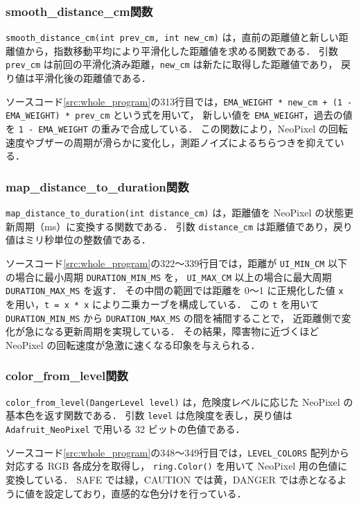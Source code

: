 \documentclass[a4paper,fontsize=11pt,line_length=40zw,number_of_lines=35,baselineskip=1.7zw]{jlreq}
\begin{document}
\subsubsection{smooth\_distance\_cm関数}

\lstinline|smooth_distance_cm(int prev_cm, int new_cm)| は，直前の距離値と新しい距離値から，指数移動平均により平滑化した距離値を求める関数である．
引数 \lstinline|prev_cm| は前回の平滑化済み距離，\lstinline|new_cm| は新たに取得した距離値であり，
戻り値は平滑化後の距離値である．

ソースコード\ref{src:whole_program}の313行目では，\lstinline|EMA_WEIGHT * new_cm + (1 - EMA_WEIGHT) * prev_cm| という式を用いて，
新しい値を \lstinline|EMA_WEIGHT|，過去の値を \lstinline|1 - EMA_WEIGHT| の重みで合成している．
この関数により，NeoPixel の回転速度やブザーの周期が滑らかに変化し，測距ノイズによるちらつきを抑えている．

\subsubsection{map\_distance\_to\_duration関数}

\lstinline|map_distance_to_duration(int distance_cm)| は，距離値を NeoPixel の状態更新周期（ms）に変換する関数である．
引数 \lstinline|distance_cm| は距離値であり，戻り値はミリ秒単位の整数値である．

ソースコード\ref{src:whole_program}の322〜339行目では，距離が \lstinline|UI_MIN_CM| 以下の場合に最小周期 \lstinline|DURATION_MIN_MS| を，
\lstinline|UI_MAX_CM| 以上の場合に最大周期 \lstinline|DURATION_MAX_MS| を返す．
その中間の範囲では距離を 0〜1 に正規化した値 \lstinline|x| を用い，\lstinline|t = x * x| により二乗カーブを構成している．
この \lstinline|t| を用いて \lstinline|DURATION_MIN_MS| から \lstinline|DURATION_MAX_MS| の間を補間することで，
近距離側で変化が急になる更新周期を実現している．
その結果，障害物に近づくほど NeoPixel の回転速度が急激に速くなる印象を与えられる．

\subsubsection{color\_from\_level関数}

\lstinline|color_from_level(DangerLevel level)| は，危険度レベルに応じた NeoPixel の基本色を返す関数である．
引数 \lstinline|level| は危険度を表し，戻り値は \lstinline|Adafruit_NeoPixel| で用いる 32 ビットの色値である．

ソースコード\ref{src:whole_program}の348〜349行目では，\lstinline|LEVEL_COLORS| 配列から対応する RGB 各成分を取得し，
\lstinline|ring.Color()| を用いて NeoPixel 用の色値に変換している．
SAFE では緑，CAUTION では黄，DANGER では赤となるように値を設定しており，直感的な色分けを行っている．
\end{document}
